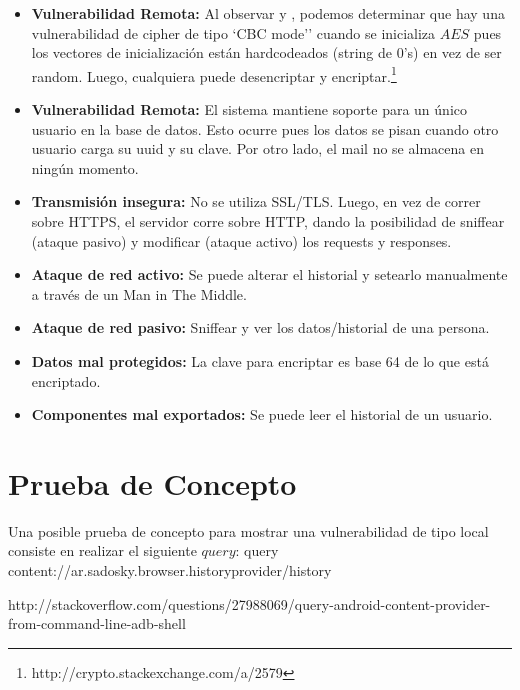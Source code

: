 \documentclass[10pt, a4paper]{article}
\begin{document}
\begin{itemize}

\item \textbf{Vulnerabilidad Remota:} Al observar  y , podemos determinar que hay una vulnerabilidad de cipher de tipo `CBC mode'' cuando se inicializa $AES$ pues los vectores de inicialización están hardcodeados (string de 0's) en vez de ser random. Luego, cualquiera puede desencriptar y encriptar.\footnote{http://crypto.stackexchange.com/a/2579}

\item \textbf{Vulnerabilidad Remota:} El sistema mantiene soporte para un único usuario en la base de datos. Esto ocurre pues los datos se pisan cuando otro usuario carga su uuid y su clave. Por otro lado, el mail no se almacena en ningún momento.

\item \textbf{Transmisión insegura:} No se utiliza SSL/TLS. Luego, en vez de correr sobre HTTPS, el servidor corre sobre HTTP, dando la posibilidad de sniffear (ataque pasivo) y modificar (ataque activo) los requests y responses.

\item \textbf{Ataque de red activo:} Se puede alterar el historial y setearlo manualmente a través de un Man in The Middle.

\item \textbf{Ataque de red pasivo:} Sniffear y ver los datos/historial de una persona.

\item \textbf{Datos mal protegidos:} La clave para encriptar es base 64 de lo que está encriptado. 

\item \textbf{Componentes mal exportados:} Se puede leer el historial de un usuario.

\end{itemize}

\section{Prueba de Concepto}

Una posible prueba de concepto para mostrar una vulnerabilidad de tipo local consiste en realizar el siguiente $query$:
query content://ar.sadosky.browser.historyprovider/history

http://stackoverflow.com/questions/27988069/query-android-content-provider-from-command-line-adb-shell
\end{document}
